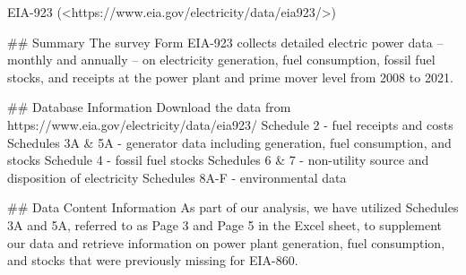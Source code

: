 EIA-923 (<https://www.eia.gov/electricity/data/eia923/>)

## Summary
The survey Form EIA-923 collects detailed electric power data -- monthly and annually -- on electricity generation, fuel consumption, fossil fuel stocks, and receipts at the power plant and prime mover level from 2008 to 2021.

## Database Information
Download the data from https://www.eia.gov/electricity/data/eia923/
Schedule 2 - fuel receipts and costs
Schedules 3A & 5A - generator data including generation, fuel consumption, and stocks
Schedule 4 - fossil fuel stocks
Schedules 6 & 7 - non-utility source and disposition of electricity
Schedules 8A-F - environmental data


## Data Content Information
As part of our analysis, we have utilized Schedules 3A and 5A, referred to as Page 3 and Page 5 in the Excel sheet, to supplement our data and retrieve information on power plant generation, fuel consumption, and stocks that were previously missing for EIA-860.